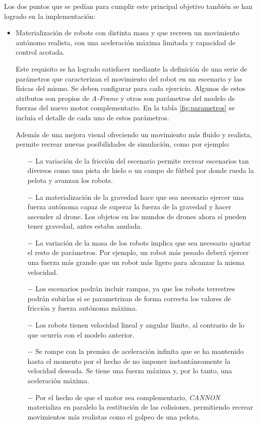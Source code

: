 Los dos puntos que se pedían para cumplir este principal objetivo también se han logrado en la implementación:

\begin{itemize}
    \item Materialización de robots con distinta masa y que recreen un movimiento autónomo realista, con una aceleración máxima limitada y capacidad de control acotada.
    
    Este requisito se ha logrado satisfacer mediante la definición de una serie de parámetros que caracterizan el movimiento del robot en un escenario y las físicas del mismo. Se deben configurar para cada ejercicio. Algunos de estos atributos son propios de \textit{A-Frame} y otros son parámetros del modelo de fuerzas del nuevo motor complementario. En la tabla \ref{fig:parametros} se incluía el detalle de cada uno de estos parámetros. \newline
    
    Además de una mejora visual ofreciendo un movimiento más fluido y realista, permite recrear nuevas posibilidades de simulación, como por ejemplo:
    
    \begin{itemize}
        \item [$-$] La variación de la fricción del escenario permite recrear escenarios tan diversos como una pista de hielo o un campo de fútbol por donde rueda la pelota y avanzan los robots.
        \item [$-$] La materialización de la gravedad hace que sea necesario ejercer una fuerza autónoma capaz de superar la fuerza de la gravedad y hacer ascender al drone. Los objetos en los mundos de drones ahora sí pueden tener gravedad, antes estaba anulada.
        \item [$-$] La variación de la masa de los robots implica que sea necesario ajustar el resto de parámetros. Por ejemplo, un robot más pesado deberá ejercer una fuerza más grande que un robot más ligero para alcanzar la misma velocidad.
        \item [$-$] Los escenarios podrán incluir rampas, ya que los robots terrestres podrán subirlas si se parametrizan de forma correcta los valores de fricción y fuerza autónoma máxima.
        \item [$-$] Los robots tienen velocidad lineal y angular límite, al contrario de lo que ocurría con el modelo anterior. 
        \item [$-$] Se rompe con la premisa de aceleración infinita que se ha mantenido hasta el momento por el hecho de no imponer instantáneamente la velocidad deseada. Se tiene una fuerza máxima y, por lo tanto, una aceleración máxima.
        \item [$-$] Por el hecho de que el motor sea complementario, \textit{CANNON} materializa en paralelo la restitución de las colisiones, permitiendo recrear movimientos más realistas como el golpeo de una pelota.
    \end{itemize}
    

\end{itemize}
